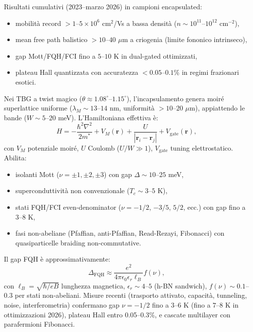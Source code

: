 \documentclass[11pt,a4paper]{article}
\theoremstyle{plain}
\theoremstyle{definition}
\begin{document}
Risultati cumulativi (2023--marzo 2026) in campioni encapsulated:
\begin{itemize}
    \item mobilità record $>1$--$5 \times 10^6$ cm$^2$/Vs a bassa densità ($n \sim 10^{11}$--$10^{12}$ cm$^{-2}$),
    \item mean free path balistico $>10$--$40$ $\mu$m a criogenia (limite fononico intrinseco),
    \item gap Mott/FQH/FCI fino a $5$--$10$ K in dual-gated ottimizzati,
    \item plateau Hall quantizzata con accuratezza $<0.05$--$0.1$\% in regimi frazionari esotici.
\end{itemize}

Nei TBG a twist magico ($\theta \approx 1.08^\circ$--$1.15^\circ$), l'incapsulamento genera moiré superlattice uniforme ($\lambda_M \sim 13$--$14$ nm, uniformità $>10$–$20$ $\mu$m), appiattendo le bande ($W \sim 5$--$20$ meV). L'Hamiltoniana effettiva è:
\begin{equation}
H = -\frac{\hbar^2 \nabla^2}{2m^*} + V_M(\mathbf{r}) + \frac{U}{|\mathbf{r}_i - \mathbf{r}_j|} + V_{\text{gate}}(\mathbf{r}),
\end{equation}
con $V_M$ potenziale moiré, $U$ Coulomb ($U/W \gg 1$), $V_{\text{gate}}$ tuning elettrostatico. Abilita:
\begin{itemize}
    \item isolanti Mott ($\nu = \pm1,\pm2,\pm3$) con gap $\Delta \sim 10$--$25$ meV,
    \item superconduttività non convenzionale ($T_c \sim 3$--$5$ K),
    \item stati FQH/FCI even-denominator ($\nu = -1/2$, $-3/5$, $5/2$, ecc.) con gap fino a $3$--$8$ K,
    \item fasi non-abeliane (Pfaffian, anti-Pfaffian, Read-Rezayi, Fibonacci) con quasiparticelle braiding non-commutative.
\end{itemize}

Il gap FQH è approssimativamente:
\begin{equation}
\Delta_{\text{FQH}} \approx \frac{e^2}{4\pi \epsilon_0 \epsilon_r \ell_B} f(\nu),
\end{equation}
con $\ell_B = \sqrt{\hbar/eB}$ lunghezza magnetica, $\epsilon_r \sim 4$--$5$ (h-BN sandwich), $f(\nu) \sim 0.1$--$0.3$ per stati non-abeliani. Misure recenti (trasporto attivato, capacità, tunneling, noise, interferometria) confermano gap $\nu = -1/2$ fino a $3$--$6$ K (fino a $7$--$8$ K in ottimizzazioni 2026), plateau Hall entro 0.05--0.3\%, e cascate multilayer con parafermioni Fibonacci.
\end{document}
